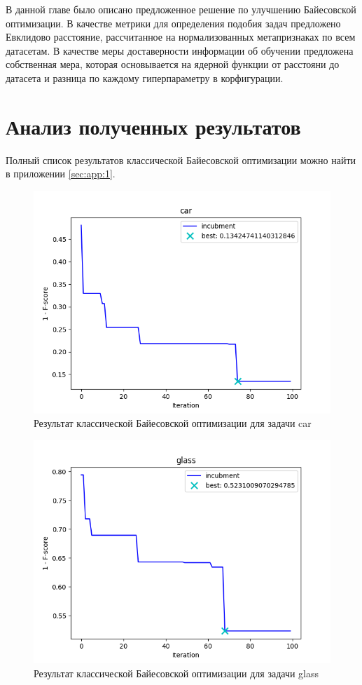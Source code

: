 \documentclass[times,specification,annotation]{itmo-student-thesis}
\begin{document}
	\chapterconclusion
	В данной главе было описано предложенное решение по улучшению Байесовской оптимизации. В качестве метрики для определения подобия задач предложено Евклидово расстояние, рассчитанное на нормализованных метапризнаках по всем датасетам. В качестве меры доставерности информации об обучении предложена собственная мера, которая основывается на ядерной функции от расстояни до датасета и разница по каждому гиперпараметру в корфигурации.
	
	\chapter{Анализ полученных результатов}
	Полный список результатов классической Байесовской оптимизации можно найти в приложении  \ref{sec:app:1}.
	\begin{figure}[!ht]
		\caption{Результат классической Байесовской оптимизации для задачи car}\label{img:bo}
		\includegraphics[width=0.85\linewidth]{car}
		\centering
	\end{figure}
	\begin{figure}[!ht]
	\caption{Результат классической Байесовской оптимизации для задачи glass}\label{img:bo}
	\includegraphics[width=0.85\linewidth]{glass}
	\centering
\end{figure}
\end{document}
